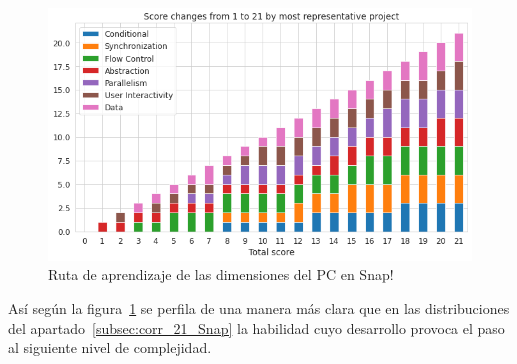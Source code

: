 \documentclass[a4paper, 12pt]{book}
\begin{document}
\begin{figure}[H]
    \centering
    \includegraphics[width=.8\textwidth]{img/path_CT_Snap.png}
    \caption{Ruta de aprendizaje de las dimensiones del PC en Snap!}\label{fig:path_Snap}
\end{figure}

Así según la figura~\ref{fig:path_Snap} se perfila de una manera más clara que en las distribuciones del apartado~\ref{subsec:corr_21_Snap} la habilidad cuyo desarrollo provoca el paso al siguiente nivel de complejidad. 
\end{document}
